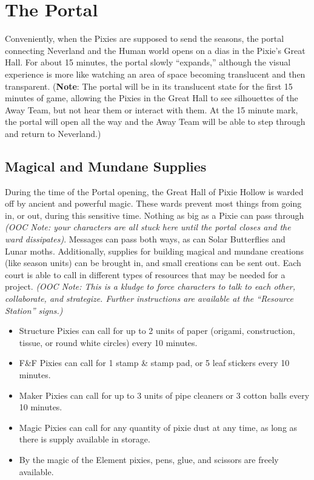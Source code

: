 \documentclass[blue]{PP}
\begin{document}
\section*{The Portal}
Conveniently, when the Pixies are supposed to send the seasons, the portal connecting Neverland and the Human world opens on a dias in the Pixie’s Great Hall. For about 15 minutes, the portal slowly “expands,” although the visual experience is more like watching an area of space becoming translucent and then transparent. (\textbf{Note}: The portal will be in its translucent state for the first 15 minutes of game, allowing the Pixies in the Great Hall to see silhouettes of the Away Team, but not hear them or interact with them. At the 15 minute mark, the portal will open all the way and the Away Team will be able to step through and return to Neverland.)

\subsection*{Magical and Mundane Supplies}
During the time of the Portal opening, the Great Hall of Pixie Hollow is warded off by ancient and powerful magic. These wards prevent most things from going in, or out, during this sensitive time. Nothing as big as a Pixie can pass through \textit{(OOC Note: your characters are all stuck here until the portal closes and the ward dissipates)}. Messages can pass both ways, as can Solar Butterflies and Lunar moths. Additionally, supplies for building magical and mundane creations (like season units) can be brought in, and small creations can be sent out. Each court is able to call in different types of resources that may be needed for a project. \textit{(OOC Note: This is a kludge to force characters to talk to each other, collaborate, and strategize. Further instructions are available at the ``Resource Station'' signs.)}

\begin{itemize}
	\item Structure Pixies can call for up to 2 units of paper (origami, construction, tissue, or round white circles) every 10 minutes.
	\item F\&F Pixies can call for 1 stamp \& stamp pad, or 5 leaf stickers every 10 minutes.
	\item Maker Pixies can call for up to 3 units of pipe cleaners or 3 cotton balls every 10 minutes.
	\item Magic Pixies can call for any quantity of pixie dust at any time, as long as there is supply available in storage.
	\item By the magic of the Element pixies, pens, glue, and scissors are freely available.
\end{itemize}
\end{document}
